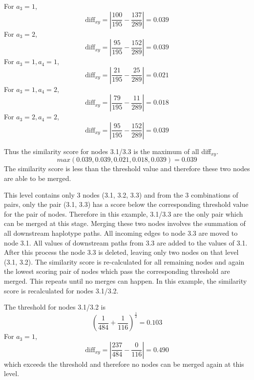 \documentclass[a4paper,11pt,twoside,abstraction,titlepage]{article}
\begin{document}
\noindent For $a_3=1$,
\begin{equation*}
\mbox{diff}_{xy} =\left|\frac{100}{195}-\frac{137}{289}\right| = 0.039 
\end{equation*}
For $a_3=2$,
\begin{equation*}
\mbox{diff}_{xy} =\left|\frac{95}{195}-\frac{152}{289}\right| = 0.039
\end{equation*}
For $a_3=1, a_4=1$,
\begin{equation*}
\mbox{diff}_{xy} =\left|\frac{21}{195}-\frac{25}{289}\right| = 0.021
\end{equation*}
For $a_3=1, a_4=2$,
\begin{equation*}
\mbox{diff}_{xy} =\left|\frac{79}{195}-\frac{11}{289}\right| = 0.018
\end{equation*}
For $a_3=2, a_4=2$,
\begin{equation*}
\mbox{diff}_{xy} =\left|\frac{95}{195}-\frac{152}{289}\right| = 0.039
\end{equation*}
\vspace{1pt}

\noindent Thus the similarity score for nodes 3.1/3.3 is the maximum of all diff$_{xy}$.
\begin{equation*}
max(0.039, 0.039, 0.021, 0.018, 0.039) = 0.039
\end{equation*}
The similarity score is less than the threshold value and therefore these two nodes are able to be merged.

This level contains only 3 nodes (3.1, 3.2, 3.3) and from the 3 combinations of pairs, only the pair (3.1, 3.3) has a score below the corresponding threshold value for the pair of nodes.  Therefore in this example, 3.1/3.3 are the only pair which can be merged at this stage.  Merging these two nodes involves the summation of all downstream haplotype paths.  All incoming edges to node 3.3 are moved to node 3.1.  All values of downstream paths from 3.3 are added to the values of 3.1.  After this process the node 3.3 is deleted, leaving only two nodes on that level (3.1, 3.2).  The similarity score is re-calculated for all remaining nodes and again the lowest scoring pair of nodes which pass the corresponding threshold are merged.  This repeats until no merges can happen.  In this example, the similarity score is recalculated for nodes 3.1/3.2.

\vspace{10pt}

\noindent The threshold for nodes 3.1/3.2 is
\vspace{-5pt}
\begin{equation*}
\left(\frac{1}{484}+\frac{1}{116}\right)^{\frac{1}{2}} = 0.103
\end{equation*}
For $a_3=1$,
\begin{equation*}
\mbox{diff}_{xy} = \left|\frac{237}{484}-\frac{0}{116}\right| = 0.490
\end{equation*}
which exceeds the threshold and therefore no nodes can be merged again at this level.
\end{document}
